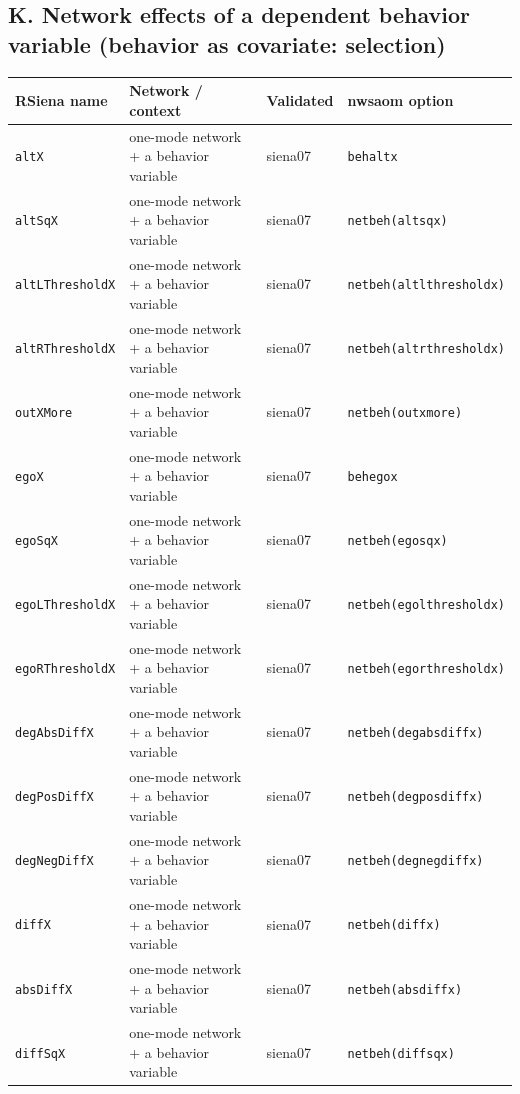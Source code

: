 \subsection*{K. Network effects of a dependent behavior variable (behavior as covariate: selection)}
\footnotesize
\begin{longtable}{@{}p{2.6cm}p{3.2cm}p{2.9cm}p{5.4cm}@{}}
\toprule
RSiena name & Network / context & Validated & nwsaom option\\
\midrule
\endhead
\texttt{altX} & one-mode network + a behavior variable & siena07 & \texttt{behaltx}\\
\texttt{altSqX} & one-mode network + a behavior variable & siena07 & \texttt{netbeh(altsqx)}\\
\texttt{altLThresholdX} & one-mode network + a behavior variable & siena07 & \texttt{netbeh(altlthresholdx)}\\
\texttt{altRThresholdX} & one-mode network + a behavior variable & siena07 & \texttt{netbeh(altrthresholdx)}\\
\texttt{outXMore} & one-mode network + a behavior variable & siena07 & \texttt{netbeh(outxmore)}\\
\texttt{egoX} & one-mode network + a behavior variable & siena07 & \texttt{behegox}\\
\texttt{egoSqX} & one-mode network + a behavior variable & siena07 & \texttt{netbeh(egosqx)}\\
\texttt{egoLThresholdX} & one-mode network + a behavior variable & siena07 & \texttt{netbeh(egolthresholdx)}\\
\texttt{egoRThresholdX} & one-mode network + a behavior variable & siena07 & \texttt{netbeh(egorthresholdx)}\\
\texttt{degAbsDiffX} & one-mode network + a behavior variable & siena07 & \texttt{netbeh(degabsdiffx)}\\
\texttt{degPosDiffX} & one-mode network + a behavior variable & siena07 & \texttt{netbeh(degposdiffx)}\\
\texttt{degNegDiffX} & one-mode network + a behavior variable & siena07 & \texttt{netbeh(degnegdiffx)}\\
\texttt{diffX} & one-mode network + a behavior variable & siena07 & \texttt{netbeh(diffx)}\\
\texttt{absDiffX} & one-mode network + a behavior variable & siena07 & \texttt{netbeh(absdiffx)}\\
\texttt{diffSqX} & one-mode network + a behavior variable & siena07 & \texttt{netbeh(diffsqx)}\\

\end{longtable}
